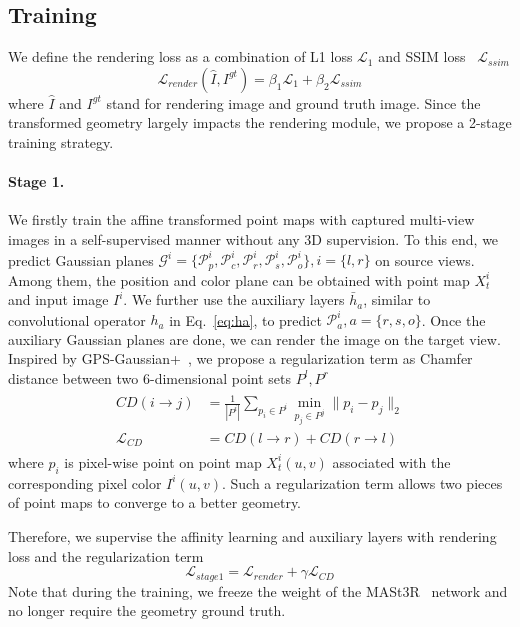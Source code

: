 \subsection{Training}

We define the rendering loss as a combination of L1 loss $\mathcal{L}_1$ and SSIM loss~\cite{wang2004ssim} $\mathcal{L}_{ssim}$
\begin{equation}
    \mathcal{L}_{render}(\hat{I}, I^{gt}) = \beta_1 \mathcal{L}_1 + \beta_2 \mathcal{L}_{ssim}
    \label{eq:render_loss}
\end{equation}
where $\hat{I}$ and $I^{gt}$ stand for rendering image and ground truth image.
Since the transformed geometry largely impacts the rendering module, we propose a 2-stage training strategy. 


\paragraph{Stage 1.} We firstly train the affine transformed point maps with captured multi-view images in a self-supervised manner without any 3D supervision.
%
To this end, we predict Gaussian planes $\mathcal{G}^i = \{ \mathcal{P}_p^i, \mathcal{P}_c^i, \mathcal{P}_r^i, \mathcal{P}_s^i, \mathcal{P}_o^i \}, i=\{ l,r \}$ on source views. Among them, the position and color plane can be obtained with point map $X^i_t$ and input image $I^i$. 
%
We further use the auxiliary layers $\bar{h}_a$, similar to convolutional operator $h_a$ in Eq.~\ref{eq:ha}, to predict $\mathcal{P}_a^i, a=\{r, s, o\}$.
%
Once the auxiliary Gaussian planes are done, we can render the image on the target view.  
Inspired by GPS-Gaussian+~\cite{zhou2024gps}, we propose a regularization term as Chamfer distance between two 6-dimensional point sets $P^l, P^r$
\vspace{-2mm}
\begin{align}
\begin{split}
    CD(i \rightarrow j) &= \frac{1}{|{P}^i|}\sum_{p_i \in {P}^i} \min_{p_j \in {P}^j} \|p_i - p_j\|_2 \\ 
    \mathcal{L}_{CD} &= CD(l \rightarrow r) + CD(r \rightarrow l)
\end{split}
\label{eq:geo_regular}
\end{align}
where $p_i$ is pixel-wise point on point map $X_t^i(u,v)$ associated with the corresponding pixel color $I^i(u,v)$.
Such a regularization term allows two pieces of point maps to converge to a better geometry.

Therefore, we supervise the affinity learning and auxiliary layers with rendering loss and the regularization term
\begin{equation}
    \mathcal{L}_{stage1} = \mathcal{L}_{render} + \gamma\mathcal{L}_{CD}
    \label{eq:loss1}
\end{equation}
Note that during the training, we freeze the weight of the MASt3R~\cite{leroy2024grounding} network and no longer require the geometry ground truth. 

